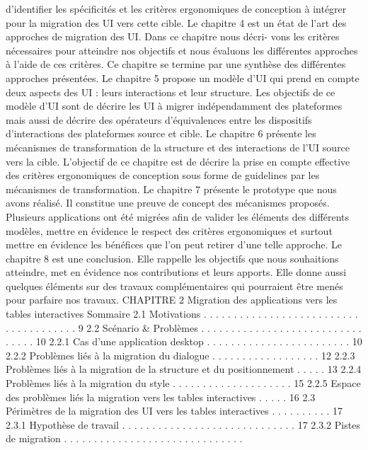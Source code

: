 \documentclass{article}
\begin{document}
d’identiﬁer les spéciﬁcités et les critères ergonomiques de conception à intégrer pour la migration
des UI vers cette cible.
Le chapitre 4 est un état de l’art des approches de migration des UI. Dans ce chapitre nous décri-
vons les critères nécessaires pour atteindre nos objectifs et nous évaluons les différentes approches à
l’aide de ces critères. Ce chapitre se termine par une synthèse des différentes approches présentées.
Le chapitre 5 propose un modèle d’UI qui prend en compte deux aspects des UI : leurs interactions
et leur structure. Les objectifs de ce modèle d’UI sont de décrire les UI à migrer indépendamment des
plateformes mais aussi de décrire des opérateurs d’équivalences entre les dispositifs d’interactions des
plateformes source et cible.
Le chapitre 6 présente les mécanismes de transformation de la structure et des interactions de l’UI
source vers la cible. L’objectif de ce chapitre est de décrire la prise en compte effective des critères
ergonomiques de conception sous forme de guidelines par les mécanismes de transformation.
Le chapitre 7 présente le prototype que nous avons réalisé. Il constitue une preuve de concept des
mécanismes proposés. Plusieurs applications ont été migrées aﬁn de valider les éléments des différents
modèles, mettre en évidence le respect des critères ergonomiques et surtout mettre en évidence les
bénéﬁces que l’on peut retirer d’une telle approche.
Le chapitre 8 est une conclusion. Elle rappelle les objectifs que nous souhaitions atteindre, met
en évidence nos contributions et leurs apports. Elle donne aussi quelques éléments sur des travaux
complémentaires qui pourraient être menés pour parfaire nos travaux.
CHAPITRE 2
Migration des applications vers les tables
interactives
Sommaire
2.1
Motivations . . . . . . . . . . . . . . . . . . . . . . . . . . . . . . . . . . . . . .
9
2.2
Scénario & Problèmes . . . . . . . . . . . . . . . . . . . . . . . . . . . . . . . .
10
2.2.1
Cas d’une application desktop . . . . . . . . . . . . . . . . . . . . . . . .
10
2.2.2
Problèmes liés à la migration du dialogue . . . . . . . . . . . . . . . . . .
12
2.2.3
Problèmes liés à la migration de la structure et du positionnement . . . . .
13
2.2.4
Problèmes liés à la migration du style . . . . . . . . . . . . . . . . . . . .
15
2.2.5
Espace des problèmes liés la migration vers les tables interactives . . . . .
16
2.3
Périmètres de la migration des UI vers les tables interactives . . . . . . . . . .
17
2.3.1
Hypothèse de travail . . . . . . . . . . . . . . . . . . . . . . . . . . . . .
17
2.3.2
Pistes de migration . . . . . . . . . . . . . . . . . . . . . . . . . . . . . .
\end{document}
